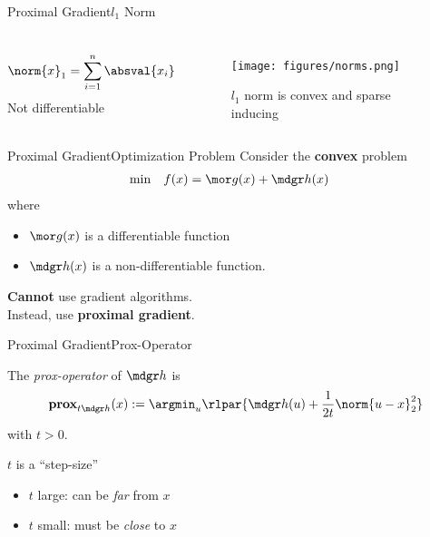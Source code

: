 \begin{frame}{Proximal Gradient}{$l_1$ Norm}
    \begin{columns}
            \begin{align*}
                \norm{x}_1 = \sum_{i=1}^n \absval{x_i}
            \end{align*} 
            {\bdgr Not differentiable}
        \begin{figure}[htb]
            \centering
            \texttt{[image: figures/norms.png]}
            \caption{$l_1$ norm is convex and sparse inducing \cite{brunton_l1_sparse}}
            \label{fig:l1-norm}
        \end{figure}
        \end{columns}
\end{frame}

\begin{frame}{Proximal Gradient}{Optimization Problem}
    Consider the  \textbf{convex} problem
    \begin{align*}
        \min \quad & f(x) = {\mor g(x)} + {\mdgr h(x)}
    \end{align*}
    where
    \begin{itemize}
        \item ${\mor g(x)}$ is a {\bor differentiable} function
        \item ${\mdgr h(x)}$ is a {\bdgr non-differentiable} function.
    \end{itemize}
    \bigskip
    \textbf{Cannot} use gradient algorithms.\\
    \bigskip
    Instead, use \textbf{proximal gradient}.
\end{frame}

\begin{frame}{Proximal Gradient}{Prox-Operator}
    \begin{definitionN}
        The \emph{prox-operator} of ${\mdgr h}$ is
        \begin{align}
            \textbf{prox}_{t{\mdgr h}}(x) := \argmin_u \rlpar{{\mdgr h(u)} + \frac{1}{2t}\norm{u-x}_2^2}
        \end{align}
        with $t > 0$.
    \end{definitionN}
    $t$ is a ``step-size''
    \begin{itemize}
        \item $t$ large: can be \emph{far} from $x$
        \item $t$ small: must be \emph{close} to $x$
    \end{itemize}
\end{frame}

